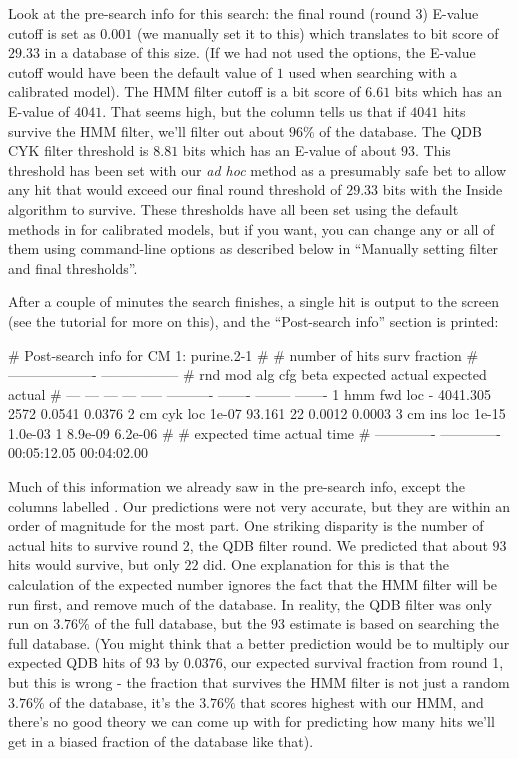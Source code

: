 Look at the pre-search info for this search: the final round (round 3)
E-value cutoff is set as $0.001$ (we manually set it to this) which
translates to bit score of $29.33$ in a database of this size. (If we
had not used the  options, the E-value cutoff would have been
the default value of $1$ used when searching with a calibrated
model). The HMM filter cutoff is a bit score of $6.61$ bits which has
an E-value of $4041$.  That seems high, but the  column
tells us that if $4041$ hits survive the HMM filter, we'll filter out
about $96\%$ of the database. The QDB CYK filter threshold is
$8.81$ bits which has an E-value of about $93$. This threshold has
been set with our \emph{ad hoc} method as a presumably safe bet to
allow any hit that would exceed our final round threshold of $29.33$
bits with the Inside algorithm to survive. These thresholds have all
been set using the default methods in  for calibrated
models, but if you want, you can change any or all of them using
command-line options as described below in ``Manually setting filter
and final thresholds''.

After a couple of minutes the search finishes, a single hit is output
to the screen (see the tutorial for more on this), and the
``Post-search info'' section is printed:

\begin{sreoutput}
# Post-search info for CM 1: purine.2-1
#
#                              number of hits       surv fraction  
#                            -------------------  -----------------
# rnd  mod  alg  cfg   beta    expected   actual  expected   actual
# ---  ---  ---  ---  -----  ----------  -------  --------  -------
    1  hmm  fwd  loc      -    4041.305     2572    0.0541   0.0376
    2   cm  cyk  loc  1e-07      93.161       22    0.0012   0.0003
    3   cm  ins  loc  1e-15     1.0e-03        1   8.9e-09  6.2e-06
#
# expected time    actual time
# -------------  -------------
    00:05:12.05    00:04:02.00
\end{sreoutput}

Much of this information we already saw in the pre-search info, except
the columns labelled . Our predictions were not very
accurate, but they are within an order of magnitude for the most
part. One striking disparity is the number of actual hits to survive
round 2, the QDB filter round. We predicted that about $93$ hits
would survive, but only $22$ did. One explanation for this is
that the calculation of the expected number ignores the fact that the
HMM filter will be run first, and remove much of the database. In
reality, the QDB filter was only run on $3.76\%$ of the full
database, but the $93$ estimate is based on searching the full
database. (You might think that a better prediction would be to 
multiply our expected QDB hits of $93$ by $0.0376$, our expected
survival fraction from round 1, but this is wrong - the fraction that
survives the HMM filter is not just a random $3.76\%$ of the database,
it's the $3.76\%$ that scores highest with our HMM, and there's no good
theory we can come up with for predicting how many hits we'll get in a
biased fraction of the database like that).

